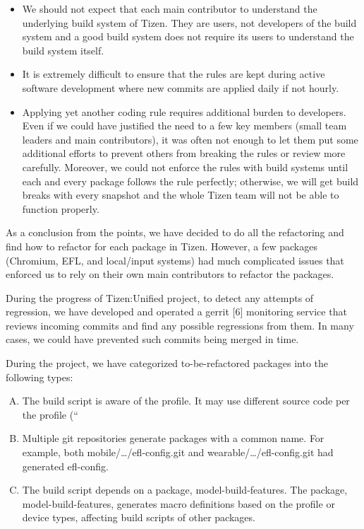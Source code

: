 \begin{itemize}
\item We should not expect that each main contributor to understand the underlying build system of Tizen. They are users, not developers of the build system and a good build system does not require its users to understand the build system itself.
\item It is extremely difficult to ensure that the rules are kept during active software development where new commits are applied daily if not hourly.
\item Applying yet another coding rule requires additional burden to developers. Even if we could have justified the need to a few key members (small team leaders and main contributors), it was often not enough to let them put some additional efforts to prevent others from breaking the rules or review more carefully. Moreover, we could not enforce the rules with build systems until each and every package follows the rule perfectly; otherwise, we will get build breaks with every snapshot and the whole Tizen team will not be able to function properly.
\end{itemize}


As a conclusion from the points, we have decided to do all the refactoring and find how to refactor for each package in Tizen. However, a few packages (Chromium, EFL, and local/input systems) had much complicated issues that enforced us to rely on their own main contributors to refactor the packages.


During the progress of Tizen:Unified project, to detect any attempts of regression, we have developed and operated a gerrit [6] monitoring service that reviews incoming commits and find any possible regressions from them. In many cases, we could have prevented such commits being merged in time.


During the project, we have categorized to-be-refactored packages into the following types:
\begin{enumerate}[A.]
\item The build script is aware of the profile. It may use different source code per the profile (“%
\item Multiple git repositories generate packages with a common name. For example, both mobile/…/efl-config.git and wearable/…/efl-config.git had generated efl-config.
\item The build script depends on a package, model-build-features. The package, model-build-features, generates macro definitions based on the profile or device types, affecting build scripts of other packages.
\end{enumerate}

